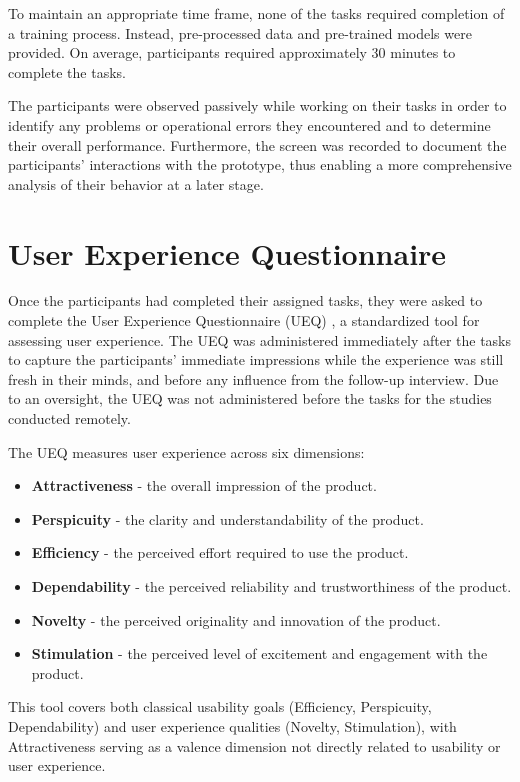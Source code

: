 To maintain an appropriate time frame, none of the tasks required completion of a training process. 
Instead, pre-processed data and pre-trained models were provided.
On average, participants required approximately 30 minutes to complete the tasks.

The participants were observed passively while working on their tasks in order to identify any problems or operational errors they encountered and to determine their overall performance.
Furthermore, the screen was recorded to document the participants' interactions with the prototype, thus enabling a more comprehensive analysis of their behavior at a later stage.

\section{User Experience Questionnaire}
\label{sec:study:ueq}

Once the participants had completed their assigned tasks, they were asked to complete the User Experience Questionnaire (UEQ) \cite{laugwitz_construction_2008}, a standardized tool for assessing user experience.
The UEQ was administered immediately after the tasks to capture the participants' immediate impressions while the experience was still fresh in their minds, and before any influence from the follow-up interview.
Due to an oversight, the UEQ was not administered before the tasks for the studies conducted remotely.

\newpage

The UEQ measures user experience across six dimensions:

\begin{itemize}
  \item \textbf{Attractiveness} - the overall impression of the product.
  \item \textbf{Perspicuity} - the clarity and understandability of the product.
  \item \textbf{Efficiency} - the perceived effort required to use the product.
  \item \textbf{Dependability} - the perceived reliability and trustworthiness of the product.
  \item \textbf{Novelty} - the perceived originality and innovation of the product.
  \item \textbf{Stimulation} - the perceived level of excitement and engagement with the product.
\end{itemize}

This tool covers both classical usability goals (Efficiency, Perspicuity, Dependability) and user experience qualities (Novelty, Stimulation), with Attractiveness serving as a valence dimension not directly related to usability or user experience.

